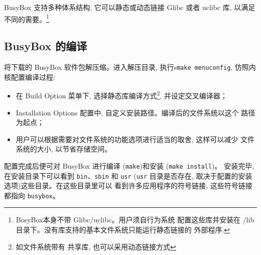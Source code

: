 BusyBox 支持多种体系结构, 它可以静态或动态链接 Glibc 或者 uclibc 库,
以满足不同的需要。\footnote{BosyBox本身不带 Glibc/uclibc。用户须自行为系统
配置这些库并安装在 /lib目录下。没有库支持的基本文件系统只能运行静态链接的
外部程序.}

\subsection{BusyBox 的编译}
将下载的 BusyBox 软件包解压缩。进入解压目录, 执行s\verb|make menuconfig|,
仿照内核配置编译过程:
\begin{itemize}
    \item 在 Build Option 菜单下, 选择静态库编译方式\footnote{如文件系统带有
        共享库, 也可以采用动态链接方式}, 并设定交叉编译器；
    \item Installation Options 配置中, 自定义安装路径。编译后的文件系统以这个
        路径为起点；
    \item 用户可以根据需要对文件系统的功能选项进行适当的取舍, 这样可以减少
        文件系统的大小, 以节省存储空间。
\end{itemize}
配置完成后便可对 BusyBox 进行编译 (\verb|make|)和安装 (\verb|make install|)。
安装完毕, 在安装目录下可以看到 \verb|bin|、\verb|sbin| 和 \verb|usr|
(\verb|usr| 目录是否存在, 取决于配置的安装选项)这些目录。在这些目录里可以
看到许多应用程序的符号链接, 这些符号链接都指向 \verb|busybox|。

